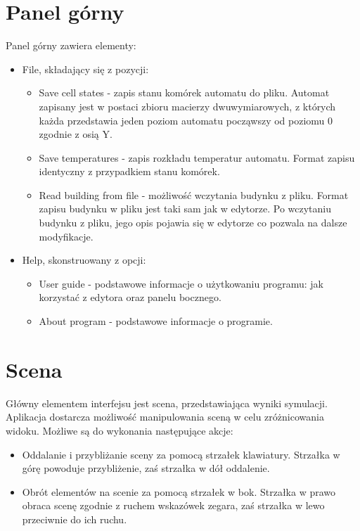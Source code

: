 \section{Panel górny}
Panel górny zawiera elementy:
\begin{itemize}
\item File, składający się z pozycji:
\begin{itemize}
\item Save cell states - zapis stanu komórek automatu do pliku. Automat zapisany jest w postaci zbioru macierzy dwuwymiarowych, z których każda przedstawia jeden poziom automatu począwszy od poziomu 0 zgodnie z osią Y.
\item Save temperatures - zapis rozkładu temperatur automatu. Format zapisu identyczny z przypadkiem stanu komórek.
\item Read building from file - możliwość wczytania budynku z pliku. Format zapisu budynku w pliku jest taki sam jak w edytorze.
	Po wczytaniu budynku z pliku, jego opis pojawia się w edytorze co pozwala na dalsze modyfikacje.
\end {itemize}
\item Help, skonstruowany z opcji:
\begin {itemize}
\item User guide - podstawowe informacje o użytkowaniu programu: jak korzystać z edytora oraz panelu bocznego.
\item About program - podstawowe informacje o programie.
\end {itemize}
\end{itemize}

\section{Scena}
Główny elementem interfejsu jest scena, przedstawiająca wyniki symulacji. Aplikacja dostarcza możliwość manipulowania sceną w celu zróżnicowania widoku. Możliwe są do wykonania następujące akcje:
\begin {itemize}
\item Oddalanie i przybliżanie sceny za pomocą strzałek klawiatury. Strzałka w górę powoduje przybliżenie, zaś strzałka w dół oddalenie.
\item Obrót elementów na scenie za pomocą strzałek w bok. Strzałka w prawo obraca scenę zgodnie z ruchem wskazówek zegara, zaś strzałka w lewo przeciwnie do ich ruchu.
\end {itemize}

